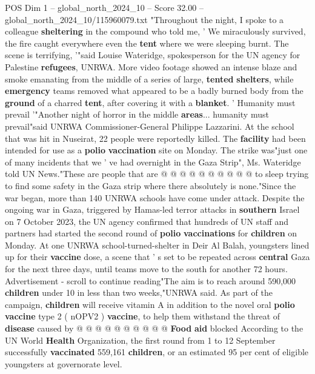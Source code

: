 \begin{textsample}{POS Dim 1 – global\_north\_2024\_10 – Score 32.00 – global\_north\_2024\_10/115960079.txt}  \label{ex:f1_pos_377}
"Throughout the night, I spoke to a colleague \textbf{sheltering} in the compound who told me, ' We miraculously survived, the fire caught everywhere even the \textbf{tent} where we were sleeping burnt.
The scene is terrifying, '"said Louise Wateridge, spokesperson for the UN agency for Palestine \textbf{refugees}, UNRWA.
More video footage showed an intense blaze and smoke emanating from the middle of a series of large, \textbf{tented} \textbf{shelters}, while \textbf{emergency} teams removed what appeared to be a badly burned body from the \textbf{ground} of a charred \textbf{tent}, after covering it with a \textbf{blanket}. ' Humanity must prevail '"Another night of horror in the middle \textbf{areas}... humanity must prevail"said UNRWA Commissioner-General Philippe Lazzarini.
At the school that was hit in Nuseirat, 22 people were reportedly killed.
The \textbf{facility} had been intended for use as a \textbf{polio} \textbf{vaccination} site on Monday.
The strike was"just one of many incidents that we ' ve had overnight in the Gaza Strip", Ms.
Wateridge told UN News."These are people that are @ @ @ @ @ @ @ @ @ @ to sleep trying to find some safety in the Gaza strip where there absolutely is none."Since the war began, more than 140 UNRWA schools have come under attack.
Despite the ongoing war in Gaza, triggered by Hamas-led terror attacks in \textbf{southern} Israel on 7 October 2023, the UN agency confirmed that hundreds of UN staff and partners had started the second round of \textbf{polio} \textbf{vaccinations} for \textbf{children} on Monday.
At one UNRWA school-turned-shelter in Deir Al Balah, youngsters lined up for their \textbf{vaccine} dose, a scene that ' s set to be repeated across \textbf{central} Gaza for the next three days, until teams move to the south for another 72 hours.
Advertisement - scroll to continue reading"The aim is to reach around 590,000 \textbf{children} under 10 in less than two weeks,"UNRWA said.
As part of the campaign, \textbf{children} will receive vitamin A in addition to the novel oral \textbf{polio} \textbf{vaccine} type 2 ( nOPV2 ) \textbf{vaccine}, to help them withstand the threat of \textbf{disease} caused by @ @ @ @ @ @ @ @ @ @ \textbf{Food} \textbf{aid} blocked According to the UN World \textbf{Health} Organization, the first round from 1 to 12 September successfully \textbf{vaccinated} 559,161 \textbf{children}, or an estimated 95 per cent of eligible youngsters at governorate level.

\end{textsample}
